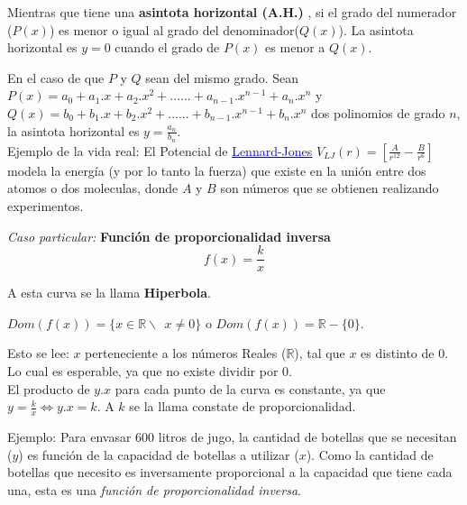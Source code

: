 \documentclass[a4paper,11pt,spanish,sans]{exam}
\begin{document}
Mientras que tiene una \textbf{asintota horizontal (A.H.)} , si el grado del numerador ($P(x)$) es menor o igual al grado del denominador($Q(x)$).
La asintota horizontal es $y=0$ cuando el grado de $P(x)$ es menor a $Q(x)$.

En el caso de que $P$ y $Q$ sean del mismo grado. 
Sean $P(x)=a_0+a_1.x+a_2.x^2+......+a_{n-1}.x^{n-1}+a_n.x^n$ y $Q(x)=b_0+b_1.x+b_2.x^2+......+b_{n-1}.x^{n-1}+b_n.x^n$ dos polinomios de grado $n$, la asintota horizontal es $y=\frac{a_n}{b_n}$. \\


Ejemplo de la vida real: El Potencial de \href{https://es.wikipedia.org/wiki/Potencial_de_Lennard-Jones}{\textcolor{blue}{Lennard-Jones}}  $V_{LJ}(r)=[\frac{A}{r^{12}}-\frac{B}{r^6}]$  modela la energía (y por lo tanto la fuerza) que existe en la unión entre dos atomos o dos moleculas, donde $A$ y $B$ son números que se obtienen realizando experimentos.


\label{inversa}
\emph{Caso particular:} \textbf{Función de proporcionalidad inversa}
\[f(x)=\frac{k}{x}\]
\begin{flushright}
A esta curva se la llama \textbf{Hiperbola}.
\end{flushright}

$Dom(f(x))=\lbrace x \in \mathbb{R} \backslash \:  \: x\neq 0 \rbrace$ o 
$Dom(f(x))= \mathbb{R} - \lbrace 0\rbrace  $.

Esto se lee: $x$ perteneciente a los números  Reales ($\mathbb{R}$), tal que $x$ es distinto de $0$.
Lo cual es esperable, ya que no existe dividir por 0.\\ 

El producto de $y.x$ para cada punto de la curva es constante, ya que $y=\frac{k}{x} \Leftrightarrow y.x=k $. A $k$ se la llama constate de proporcionalidad.



Ejemplo: 
Para envasar 600 litros de jugo, la cantidad de botellas que se necesitan ($y$) es función de la capacidad de botellas a utilizar ($x$). Como la cantidad de botellas que necesito es inversamente proporcional a la capacidad que tiene cada una, esta es una \emph{función de proporcionalidad inversa}. 
\end{document}
